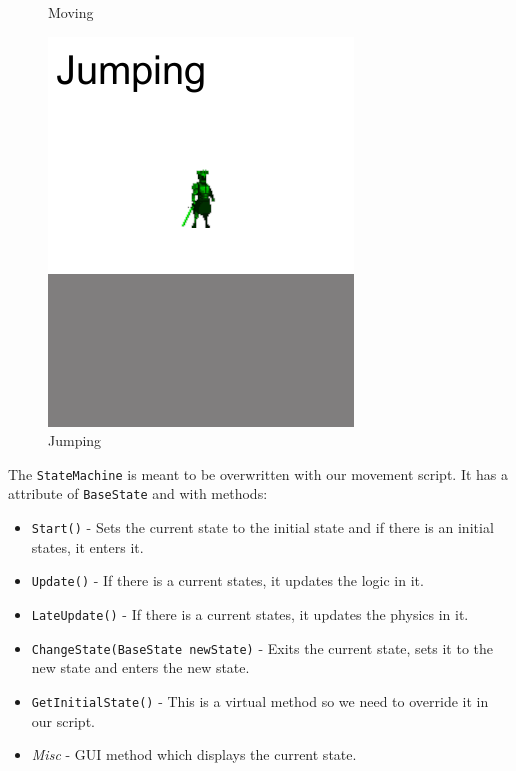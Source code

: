\documentclass[a4paper, 12pt]{book}
\begin{document}
\begin{figure}[!hb]
  \caption{Moving}\label{StateFig:Moving}
\endminipage\hfill
{}%
  \includegraphics[width=\linewidth]{Images/JumpingState.png}
  \caption{Jumping}\label{StateFig:Jumping}
\endminipage
\label{StateMachine}
\end{figure}

The \texttt{StateMachine} is meant to be overwritten with our movement script. It has a attribute of \texttt{BaseState} and with methods: 
\begin{itemize}
    \item \texttt{Start()} - Sets the current state to the initial state and if there is an initial states, it enters it.
    \item \texttt{Update()} - If there is a current states, it updates the logic in it.
    \item \texttt{LateUpdate()} - If there is a current states, it updates the physics in it.
    \item \texttt{ChangeState(BaseState newState)} - Exits the current state, sets it to the new state and enters the new state.
    \item \texttt{GetInitialState()} - This is a virtual method so we need to override it in our script.
    \item \emph{Misc} - GUI method which displays the current state.
\end{itemize}
\end{document}
